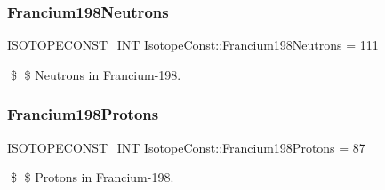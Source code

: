 \subsubsection{\texorpdfstring{Francium198\+Neutrons}{Francium198Neutrons}}
{\footnotesize\ttfamily \mbox{\hyperlink{group___isotope_const-_macros_ga5f18360b3e99483a35c32d789e62621c}{I\+S\+O\+T\+O\+P\+E\+C\+O\+N\+S\+T\+\_\+\+I\+NT}} Isotope\+Const\+::\+Francium198\+Neutrons = 111}

\$ \$ Neutrons in Francium-\/198. \mbox{\label{group___isotope_const-_francium-_fr198_ga0201a63358c28802b8e924370b2a8ca1}} 
\subsubsection{\texorpdfstring{Francium198\+Protons}{Francium198Protons}}
{\footnotesize\ttfamily \mbox{\hyperlink{group___isotope_const-_macros_ga5f18360b3e99483a35c32d789e62621c}{I\+S\+O\+T\+O\+P\+E\+C\+O\+N\+S\+T\+\_\+\+I\+NT}} Isotope\+Const\+::\+Francium198\+Protons = 87}

\$ \$ Protons in Francium-\/198. 
